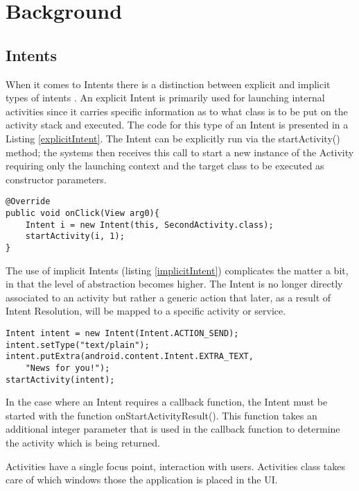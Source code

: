 \section{Background}
\label{background}

\subsection{Intents} 
\label{intents}
When it comes to Intents there is a distinction between explicit and implicit types of intents \cite{intent}.
An explicit Intent is primarily used for launching internal activities since it carries specific information as to what class is to be put on the activity stack and executed. The code for this type of an Intent is presented in a Listing \ref{explicitIntent}. The Intent can be explicitly run via the startActivity() method; the systems then receives this call to start a new instance of the Activity requiring only the launching context and the target class to be executed as constructor parameters.

\footnotesize\begin{lstlisting}[label=explicitIntent,caption=Explicit Intent]
@Override
public void onClick(View arg0){
    Intent i = new Intent(this, SecondActivity.class);
    startActivity(i, 1);
}
\end{lstlisting}

The use of implicit Intents (listing \ref{implicitIntent}) complicates the matter a bit, in that the level of abstraction becomes higher. The Intent is no longer directly associated to an activity but rather a generic action that later, as a result of Intent Resolution, will be mapped to a specific activity or service.

{\footnotesize\begin{lstlisting}[label=implicitIntent,caption=Implicit Intent]
Intent intent = new Intent(Intent.ACTION_SEND);
intent.setType("text/plain");
intent.putExtra(android.content.Intent.EXTRA_TEXT, 
	"News for you!");
startActivity(intent);
\end{lstlisting}}

In the case where an Intent requires a callback function, the Intent must be started with the function onStartActivityResult(). This function takes an additional integer parameter that is used in the callback function to determine the activity which is being returned.

Activities have a single focus point, interaction with users. Activities class takes care of which windows those the application is placed in the UI. 


